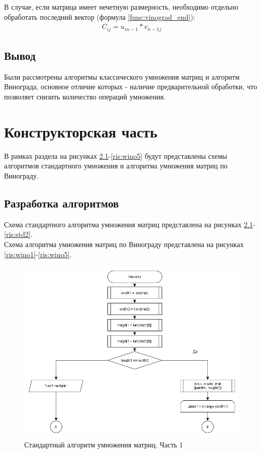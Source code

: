 \documentclass[a4paper,12pt]{report}
\begin{document}
			В случае, если матрица имеет нечетную размерность, необходимо отдельно обработать последний вектор (формула \ref{func:vinograd_end}):
			\begin{multline}
			\label{func:vinograd_end}
			C_{ij} = u_{in-1}*v_{n-1j}
			\end{multline}
    
    \section{Вывод}

    		Были рассмотрены алгоритмы классического умножения матриц и алгоритм Винограда, основное отличие которых - наличие предварительной обработки, что позволяет снизить количество операций умножения.

    \newpage

   \chapter{Конструкторская часть}
        \label{sec:construct_part}

			В рамках раздела на рисунках \ref{ris:std1}-\ref{ris:wino5} будут представлены схемы алгоритмов стандартного умножения и алгоритма умножения матриц по Винограду.

	\section{Разработка алгоритмов}

		Схема стандартного алгоритма умножения матриц представлена на рисунках \ref{ris:std1}-\ref{ris:std2}.\\
		Схема алгоритма умножения матриц по Винограду представлена на рисунках \ref{ris:wino1}-\ref{ris:wino5}.

	\begin{figure}[h!]
		\centering
		\includegraphics[width=0.8\linewidth]{basedab111.png}
		\caption{Стандартный алгоритм умножения матриц. Часть 1}
		\label{ris:std1}
	\end{figure}
\end{document}
